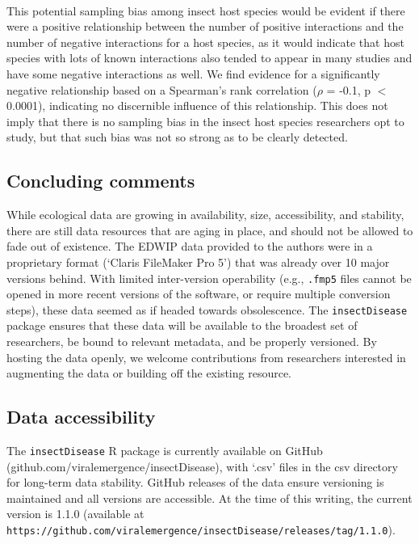 \documentclass[12pt]{article}
\begin{document}
\paragraph*{}
This potential sampling bias among insect host species would be evident if there were a positive relationship between the number of positive interactions and the number of negative interactions for a host species, as it would indicate that host species with lots of known interactions also tended to appear in many studies and have some negative interactions as well. We find evidence for a significantly negative relationship based on a Spearman's rank correlation ($\rho$ = -0.1, p $<$ 0.0001), indicating no discernible influence of this relationship. This does not imply that there is no sampling bias in the insect host species researchers opt to study, but that such bias was not so strong as to be clearly detected. 



\subsection*{Concluding comments}

While ecological data are growing in availability, size, accessibility, and stability, there are still data resources that are aging in place, and should not be allowed to fade out of existence. The EDWIP data provided to the authors were in a proprietary format (`Claris FileMaker Pro 5') that was already over 10 major versions behind. With limited inter-version operability (e.g., \texttt{.fmp5} files cannot be opened in more recent versions of the software, or require multiple conversion steps), these data seemed as if headed towards obsolescence. The \texttt{insectDisease} package ensures that these data will be available to the broadest set of researchers, be bound to relevant metadata, and be properly versioned. By hosting the data openly, we welcome contributions from researchers interested in augmenting the data or building off the existing resource. 



\subsection*{Data accessibility}
The \texttt{insectDisease} R package is currently available on GitHub \\ (github.com/viralemergence/insectDisease), with `.csv' files in the csv directory for long-term data stability. GitHub releases of the data ensure versioning is maintained and all versions are accessible. At the time of this writing, the current version is 1.1.0 (available at \\ \texttt{https://github.com/viralemergence/insectDisease/releases/tag/1.1.0}). 
 
\end{document}
